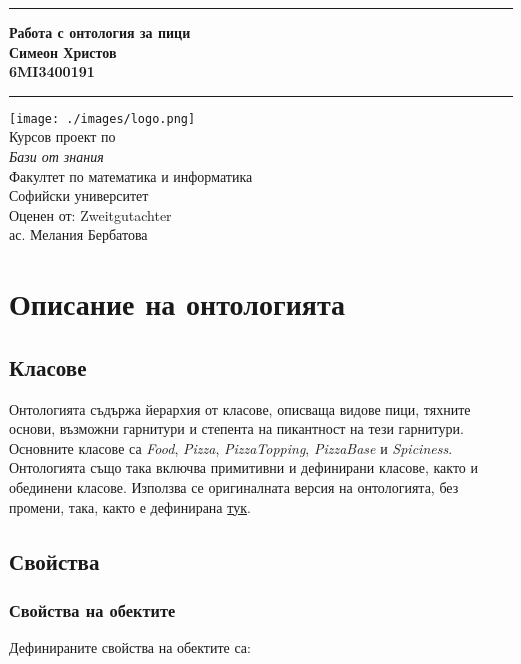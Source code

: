 \documentclass[12pt]{article}
\newcommand{\JMUTitle}[9]{

  \thispagestyle{empty}
  \vspace*{\stretch{1}}
  {\parindent0cm
  \rule{\linewidth}{.7ex}}
  \begin{flushright}
    \vspace*{\stretch{1}}
    \sffamily\bfseries\Huge
    #1\\
    \vspace*{\stretch{1}}
    \sffamily\bfseries\large
    #2\\
    \vspace*{\stretch{1}}
    \sffamily\bfseries\small
    #3
  \end{flushright}
  \rule{\linewidth}{.7ex}

  \vspace*{\stretch{1}}
  \begin{center}
    \texttt{[image: ./images/logo.png]} \\
    \vspace*{\stretch{1}}
    \Large Курсов проект по \\ \textit{Бази от знания} \\

    \vspace*{\stretch{2}}
    \large Факултет по математика и информатика\\
    \large Софийски университет\\
    
    \vspace*{\stretch{1}}
    \large Оценен от:  #8 \\[1mm]
    
    \vspace*{\stretch{1}}
    \large #7 \\

  \end{center}
}
\begin{document}
  

  \JMUTitle
      {Работа с онтология за пици}
      {Симеон Христов}
      {6MI3400191}
      
      {Wirtschaftswissenschaftlichen Fakultät}  %
      {W"urzburg 2018}                          %
      {Юни 2023}                              %
      {ас. Мелания Бербатова}               %
      {Zweitgutachter}                          %

  \clearpage

\tableofcontents

\clearpage

\section{Описание на онтологията}

    \subsection{Класове}

    Онтологията съдържа йерархия от класове, описваща видове пици, тяхните основи, възможни гарнитури и степента на пикантност на тези гарнитури. Основните класове са \textit{Food}, \textit{Pizza}, \textit{PizzaTopping}, \textit{PizzaBase} и \textit{Spiciness}. Онтологията също така включва примитивни и дефинирани класове, както и обединени класове. Използва се оригиналната версия на онтологията, без промени, така, както е дефинирана \href{https://protege.stanford.edu/ontologies/pizza/pizza.owl}{тук}.

    \subsection{Свойства}

        \subsubsection{Свойства на обектите}

        Дефинираните свойства на обектите са:
\end{document}
